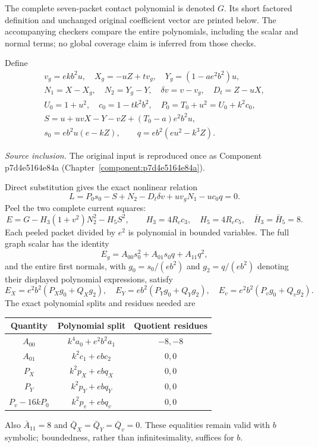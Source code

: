 The complete seven-packet contact polynomial is denoted $G$. Its short factored definition and unchanged original coefficient vector are printed below. The accompanying checkers compare the entire polynomials, including the scalar and normal terms; no global coverage claim is inferred from those checks.

Define
\begin{gather*}
v_g=ekb^2u,\quad X_g=-uZ+tv_g,\quad Y_g=(1-ae^2b^2)u,\\
N_1=X-X_g,\quad N_2=Y_g-Y,\quad \delta v=v-v_g,\quad D_t=Z-uX,\\
U_0=1+u^2,\quad c_0=1-tk^2b^2,\quad P_0=T_0+u^2=U_0+k^2c_0,\\
S=u+uvX-Y-vZ+(T_0-a)e^2b^2u,\\
s_0=eb^2u(e-kZ),\qquad q=eb^2(eu^2-k^3Z).
\end{gather*}
\par\noindent\textit{Source inclusion. }The original input is reproduced once as Component p7d4e5164e84a (Chapter~\ref{component:p7d4e5164e84a}).\par
Direct substitution gives the exact nonlinear relation
\[
L=P_0s_0-S+N_2-D_t\delta v+uv_gN_1-uc_0q=0. \tag{E1}
\]
Peel the two complete current squares:
\[
E=G-H_3(1+v^2)N_2^2-H_5S^2,\qquad
H_3=4R_cc_3,\quad H_5=4R_cc_5,\quad \bar H_3=\bar H_5=8.
\]
Each peeled packet divided by $e^2$ is polynomial in bounded variables. The full graph scalar has the identity
\[
E_g=A_{00}s_0^2+A_{01}s_0q+A_{11}q^2,
\]
and the entire first normals, with $g_0=s_0/(eb^2)$ and $g_2=q/(eb^2)$ denoting their displayed polynomial expressions, satisfy
\[
E_X=e^2b^2(P_Xg_0+Q_Xg_2),\quad
E_Y=eb^2(P_Yg_0+Q_Yg_2),\quad
E_v=e^2b^2(P_vg_0+Q_vg_2).
\]
The exact polynomial splits and residues needed are
\begin{center}\small
\begin{tabular}{ccc}\toprule
Quantity&Polynomial split&Quotient residues\\\midrule
$A_{00}$&$k^4a_0+e^2b^2a_1$&$-8,-8$\\
$A_{01}$&$k^2c_1+ebc_2$&$0,0$\\
$P_X$&$k^2p_X+ebq_X$&$0,0$\\
$P_Y$&$k^2p_Y+ebq_Y$&$0,0$\\
$P_v-16kP_0$&$k^2p_v+ebq_v$&$0,0$\\\bottomrule
\end{tabular}
\end{center}
Also $\bar A_{11}=8$ and $\bar Q_X=\bar Q_Y=\bar Q_v=0$. These equalities remain valid with $b$ symbolic; boundedness, rather than infinitesimality, suffices for $b$.

